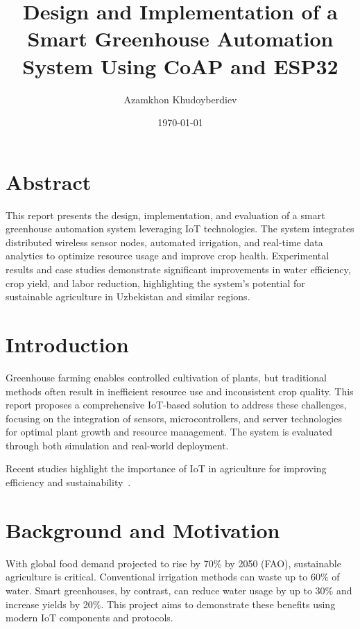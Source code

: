 \documentclass[12pt,a4paper]{article}
\title{Design and Implementation of a Smart Greenhouse Automation System Using CoAP and ESP32}
\author{Azamkhon Khudoyberdiev}
\date{\today}
\begin{document}
\maketitle
\newpage
\tableofcontents
\maketitle
\newpage

\section*{Abstract}
This report presents the design, implementation, and evaluation of a smart greenhouse automation system leveraging IoT technologies. The system integrates distributed wireless sensor nodes, automated irrigation, and real-time data analytics to optimize resource usage and improve crop health. Experimental results and case studies demonstrate significant improvements in water efficiency, crop yield, and labor reduction, highlighting the system’s potential for sustainable agriculture in Uzbekistan and similar regions.

\cite{FAO2017,SmartAgReview,ESP32Survey,CoAPRFC,Netafim2020,Priva2021,IoTGreenhouse2022}


\section{Introduction}
Greenhouse farming enables controlled cultivation of plants, but traditional methods often result in inefficient resource use and inconsistent crop quality. This report proposes a comprehensive IoT-based solution to address these challenges, focusing on the integration of sensors, microcontrollers, and server technologies for optimal plant growth and resource management. The system is evaluated through both simulation and real-world deployment.

Recent studies highlight the importance of IoT in agriculture for improving efficiency and sustainability~\cite{SmartAgReview,IoTGreenhouse2022}.


\section{Background and Motivation}
With global food demand projected to rise by 70\% by 2050 (FAO), sustainable agriculture is critical. Conventional irrigation methods can waste up to 60\% of water. Smart greenhouses, by contrast, can reduce water usage by up to 30\% and increase yields by 20\%. This project aims to demonstrate these benefits using modern IoT components and protocols.
\end{document}
